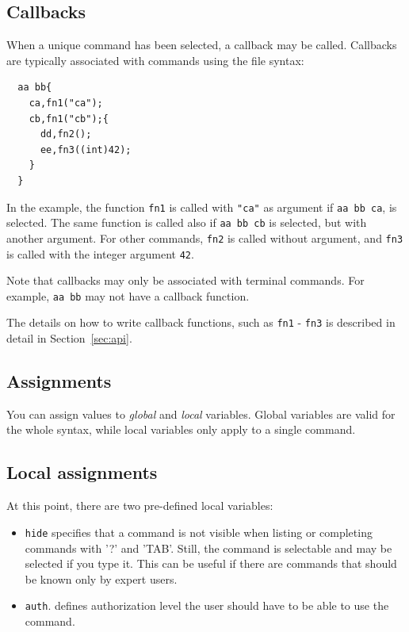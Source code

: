 \documentclass[a4paper, 10pt] {article}
\begin{document}
\subsection{Callbacks}
\label{sec:callbacks}

When a unique command has been selected, a callback may be
called. Callbacks are typically associated with commands using the
file syntax:
\begin{verbatim}
  aa bb{
    ca,fn1("ca");
    cb,fn1("cb");{
      dd,fn2();
      ee,fn3((int)42);
    }
  }
\end{verbatim}

In the example, the function {\tt fn1} is called with {\tt "ca"} as
argument if {\tt aa bb ca}, is selected. The same function is called
also if {\tt aa bb cb} is selected, but with another argument. For
other commands, {\tt fn2} is called without argument, and {\tt fn3} is
called with the integer argument {\tt 42}.

Note that callbacks may only be associated with terminal commands. For
example, {\tt aa bb} may not have a callback function.

The details on how to write callback functions, such as {\tt fn1} -
{\tt fn3} is described in detail in Section~\ref{sec:api}.

\subsection{Assignments}
\label{sec:assignments}

You can assign values to \emph{global} and \emph{local}
variables. Global variables are valid for the whole syntax, while
local variables only apply to a single command.

\subsection{Local assignments}
At this point, there are two pre-defined local variables: 
\begin{itemize}
\item
{\tt hide} specifies that a command is not visible when listing or
completing commands with '?' and 'TAB'.  Still, the command is
selectable and may be selected if you type it. This can be useful if there are
commands that should be known only by expert users.
\item
{\tt auth}.  defines authorization level the user should have to be
able to use the command.
\end{itemize}
\end{document}
